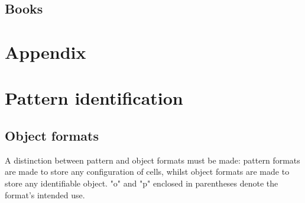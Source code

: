 \documentclass[
	11pt, %
	fleqn, %
	a4paper, %
]{LegrandOrangeBook}
\begin{document}
\printbibliography[heading=bibempty, type=article] %

\section*{Books}

\printbibliography[heading=bibempty, type=book] %


\cleardoublepage %
{} %
\printindex %


\chapterspaceabove{6.75cm} %
\chapterspacebelow{7.25cm} %

\chapter{Appendix}
\renewcommand{\chaptername}{Appendix} %


\chapter{Pattern identification}

\section{Object formats}
A distinction between pattern and object formats must be made: pattern formats are made to store any configuration of cells, whilst object formats are made to store any identifiable object. "o" and "p" enclosed in parentheses denote the format's intended use.
\end{document}
